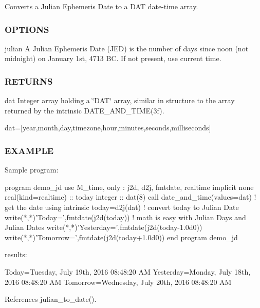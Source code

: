 \begin{DoxyVerb}
\begin{DoxyVerb} Converts a Julian Ephemeris Date to a DAT date-time array.
\end{DoxyVerb}


\subsubsection*{O\+P\+T\+I\+O\+NS}

julian A Julian Ephemeris Date (J\+ED) is the number of days since noon (not midnight) on January 1st, 4713 BC. If not present, use current time.

\subsubsection*{R\+E\+T\+U\+R\+NS}

dat Integer array holding a \char`\"{}\+D\+A\+T\char`\"{} array, similar in structure to the array returned by the intrinsic D\+A\+T\+E\+\_\+\+A\+N\+D\+\_\+\+T\+I\+M\+E(3f).

dat=\mbox{[}year,month,day,timezone,hour,minutes,seconds,milliseconds\mbox{]}

\subsubsection*{E\+X\+A\+M\+P\+LE}

\begin{DoxyVerb}Sample program:

 program demo_jd
 use M_time, only : j2d, d2j, fmtdate, realtime
 implicit none
 real(kind=realtime) :: today
 integer :: dat(8)
    call date_and_time(values=dat) ! get the date using intrinsic
    today=d2j(dat)                  ! convert today to Julian Date
    write(*,*)'Today=',fmtdate(j2d(today))
    ! math is easy with Julian Days and Julian Dates
    write(*,*)'Yesterday=',fmtdate(j2d(today-1.0d0))
    write(*,*)'Tomorrow=',fmtdate(j2d(today+1.0d0))
 end program demo_jd

results:

 Today=Tuesday, July 19th, 2016 08:48:20 AM
 Yesterday=Monday, July 18th, 2016 08:48:20 AM
 Tomorrow=Wednesday, July 20th, 2016 08:48:20 AM \end{DoxyVerb}
 

References julian\+\_\+to\+\_\+date().

\mbox{\label{namespacem__time_abb44cf18cd0a3e420c20469efb056203}} 

\end{DoxyVerb}
